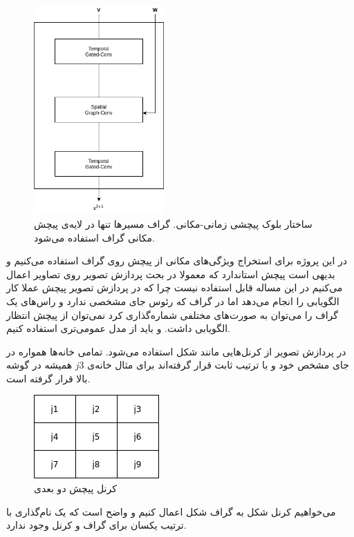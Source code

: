 \begin{figure}
  \includegraphics[height=8cm]{./images/inner-blocks.png}
  \centering
  \caption{
ساختار بلوک پیچشی زمانی-مکانی. گراف مسیرها تنها در لایه‌ی پیچش مکانی گراف استفاده می‌شود. 
  }
  \label{fig:inner-blocks}
\end{figure}

در این پروژه برای استخراج ویژگی‌های مکانی از پیچش روی گراف استفاده می‌کنیم و بدیهی است پیچش استاندارد که معمولا
در بحث پردازش تصویر روی تصاویر اعمال می‌کنیم در این مساله قابل استفاده نیست
چرا که در پردازش تصویر پیچش عملا کار الگویابی را انجام می‌دهد اما در گراف که رئوس جای مشخصی ندارد
و راس‌های یک گراف را می‌توان به صورت‌های مختلفی
شماره‌گذاری کرد نمی‌توان از پیچش انتظار الگویابی داشت.
و باید از مدل عمومی‌تری استفاده کنیم.

در پردازش تصویر از کرنل‌هایی مانند شکل  استفاده می‌شود. تمامی خانه‌ها همواره در جای مشخص خود و با ترتیب ثابت قرار گرفته‌اند
برای مثال خانه‌ی $j3$ همیشه در گوشه بالا قرار گرفته است.

\begin{figure}
  \includegraphics[]{./images/2d-convolution.png}
  \centering
  \caption{کرنل پیچش دو بعدی}
  \label{fig:2d-convolution}
\end{figure}

می‌خواهیم کرنل شکل 
به گراف شکل  اعمال کنیم و واضح است که یک نام‌گذاری با ترتیب یکسان برای گراف و کرنل وجود ندارد.


